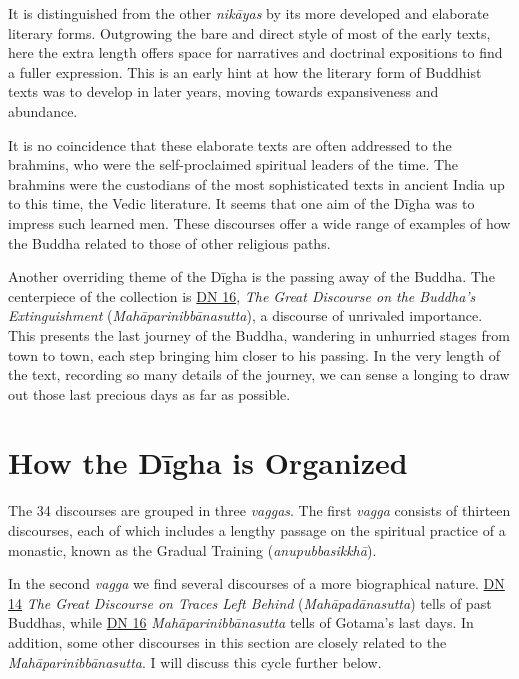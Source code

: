 \documentclass[12pt,openany]{book}%
\begin{document}
It is distinguished from the other \textit{\textsanskrit{nikāyas}} by its more developed and elaborate literary forms. Outgrowing the bare and direct style of most of the early texts, here the extra length offers space for narratives and doctrinal expositions to find a fuller expression. This is an early hint at how the literary form of Buddhist texts was to develop in later years, moving towards expansiveness and abundance.

It is no coincidence that these elaborate texts are often addressed to the brahmins, who were the self-proclaimed spiritual leaders of the time. The brahmins were the custodians of the most sophisticated texts in ancient India up to this time, the Vedic literature. It seems that one aim of the \textsanskrit{Dīgha} was to impress such learned men. These discourses offer a wide range of examples of how the Buddha related to those of other religious paths.

Another overriding theme of the \textsanskrit{Dīgha} is the passing away of the Buddha. The centerpiece of the collection is \href{https://suttacentral.net/dn16}{DN 16}, \textit{The Great Discourse on the Buddha’s Extinguishment} (\textit{\textsanskrit{Mahāparinibbānasutta}}), a discourse of unrivaled importance. This presents the last journey of the Buddha, wandering in unhurried stages from town to town, each step bringing him closer to his passing. In the very length of the text, recording so many details of the journey, we can sense a longing to draw out those last precious days as far as possible.

\section*{How the \textsanskrit{Dīgha} is Organized}

The 34 discourses are grouped in three \textit{vaggas}. The first \textit{vagga} consists of thirteen discourses, each of which includes a lengthy passage on the spiritual practice of a monastic, known as the Gradual Training (\textit{\textsanskrit{anupubbasikkhā}}).

In the second \textit{vagga} we find several discourses of a more biographical nature. \href{https://suttacentral.net/dn14}{DN 14} \textit{The Great Discourse on Traces Left Behind} (\textit{\textsanskrit{Mahāpadānasutta}}) tells of past Buddhas, while \href{https://suttacentral.net/dn16}{DN 16} \textit{\textsanskrit{Mahāparinibbānasutta}} tells of Gotama’s last days. In addition, some other discourses in this section are closely related to the \textit{\textsanskrit{Mahāparinibbānasutta}}. I will discuss this cycle further below.
\end{document}
